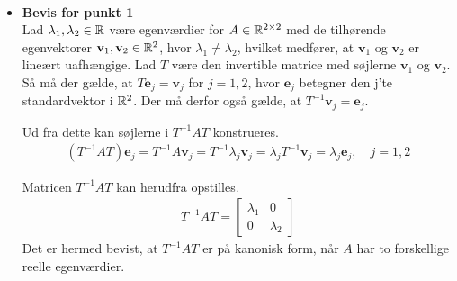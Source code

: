 \begin{bev}\textbf{}\\
    \begin{itemize}
        \item \textbf{Bevis for punkt 1}\\
        Lad $\lambda_1, \lambda_2 \in \mathbb{R}$ være egenværdier for $A\in \mathbb{R}^{2\times 2}$ med de tilhørende egenvektorer $\textbf{v}_1, \textbf{v}_2 \in \mathbb{R}^2$, hvor $\lambda_1\neq \lambda_2$, hvilket medfører, at $\textbf{v}_1$ og $\textbf{v}_2$ er lineært uafhængige. Lad $T$ være den invertible matrice med søjlerne $\textbf{v}_1$ og $\textbf{v}_2$. Så må der gælde, at $T\textbf{e}_j=\textbf{v}_j$ for $j=1,2$, hvor  $\textbf{e}_j$ betegner den j'te standardvektor i $\mathbb{R}^2$. Der må derfor også gælde, at $T^{-1}\textbf{v}_j=\textbf{e}_j$.
        
        Ud fra dette kan søjlerne i $T^{-1}AT$ konstrueres.
        \begin{align*}
            \left(T^{-1}AT\right)\textbf{e}_j 
            = T^{-1}A\textbf{v}_j 
            = T^{-1}\lambda_j\textbf{v}_j
            = \lambda_j T^{-1} \textbf{v}_j
            = \lambda_j \textbf{e}_j, \quad j=1,2
        \end{align*}
        
        Matricen $T^{-1}AT$ kan herudfra opstilles.
        \begin{align*}
            T^{-1}AT = 
            \begin{bmatrix}
                \lambda_1 & 0\\
                0 & \lambda_2
            \end{bmatrix}
        \end{align*}
        Det er hermed bevist, at $T^{-1}AT$ er på kanonisk form, når $A$ har to forskellige reelle egenværdier.
    \end{itemize}
    

\end{bev}
